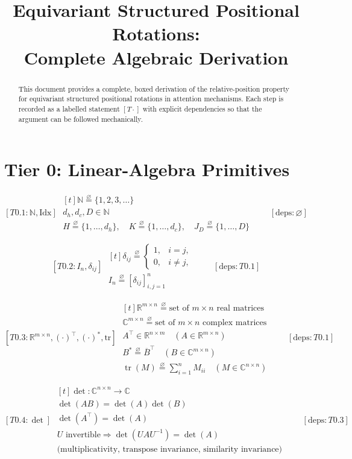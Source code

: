 \documentclass[11pt]{article}
\title{Equivariant Structured Positional Rotations:\\Complete Algebraic Derivation}
\author{}
\date{}
\newcommand{\eqdef}{\overset{\varnothing}{=}}
\newcommand{\ProofBlock}[3]{%
  \begin{equation*}
    \boxed{[#1]}\;
    \begin{aligned}[t]
      #2
    \end{aligned}
    \qquad [\mathrm{deps}: #3]
  \end{equation*}
}
\newcommand{\Note}[1]{\text{(#1)}}
\newcommand{\Real}{\mathbb{R}}
\newcommand{\Complex}{\mathbb{C}}
\begin{document}
\maketitle

\begin{abstract}
This document provides a complete, boxed derivation of the relative-position property for equivariant structured positional rotations in attention mechanisms.  Each step is recorded as a labelled statement \([T\cdot]\) with explicit dependencies so that the argument can be followed mechanically.
\end{abstract}

\tableofcontents
\newpage

\section{Tier 0: Linear-Algebra Primitives}

\ProofBlock{T0.1:\mathbb{N},\mathrm{Idx}}{
\mathbb{N} \eqdef \{1,2,3,\dots\}\\
d_h,d_c,D \in \mathbb{N}\\
H \eqdef \{1,\dots,d_h\},\quad
K \eqdef \{1,\dots,d_c\},\quad
J_D \eqdef \{1,\dots,D\}
}{\varnothing}

\ProofBlock{T0.2:I_n,\delta_{ij}}{
\delta_{ij} \eqdef
\begin{cases}
1,& i=j,\\
0,& i\neq j,
\end{cases}\\
I_n \eqdef [\delta_{ij}]_{i,j=1}^n
}{T0.1}

\ProofBlock{T0.3:\mathbb{R}^{m\times n},(\cdot)^\top,(\cdot)^*,\mathrm{tr}}{
\Real^{m\times n} \eqdef \text{set of } m\times n \text{ real matrices}\\
\Complex^{m\times n} \eqdef \text{set of } m\times n \text{ complex matrices}\\
A^\top \in \Real^{n\times m} \quad (A\in \Real^{m\times n})\\
B^* \eqdef \overline{B}^{\top} \quad (B\in \Complex^{m\times n})\\
\operatorname{tr}(M) \eqdef \sum_{i=1}^n M_{ii} \quad (M\in \Complex^{n\times n})
}{T0.1}

\ProofBlock{T0.4:\det}{
\det : \Complex^{n\times n}\to\Complex\\
\det(AB)=\det(A)\det(B)\\
\det(A^\top)=\det(A)\\
U\text{ invertible} \Rightarrow \det(UAU^{-1})=\det(A)\\
\Note{multiplicativity, transpose invariance, similarity invariance}
}{T0.3}
\end{document}
